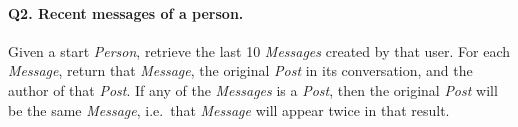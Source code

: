 \paragraph{\textbf{Q2}. Recent messages of a person.}
Given a start \emph{Person}, retrieve the last 10 \emph{Messages}
created by that user. For each \emph{Message}, return that
\emph{Message}, the original \emph{Post} in its conversation, and the
author of that \emph{Post}. If any of the \emph{Messages} is a
\emph{Post}, then the original \emph{Post} will be the same
\emph{Message}, i.e.~that \emph{Message} will appear twice in that
result.
